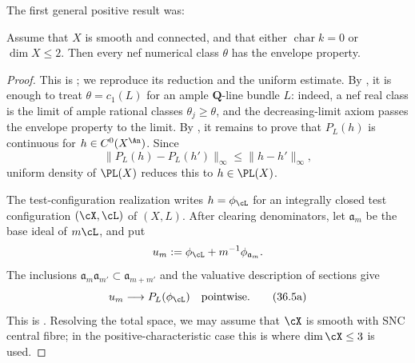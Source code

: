 The first general positive result was:

\begin{theorem}\label{thm:bj22-nef-envelope}
Assume that $X$ is smooth and connected, and that either
$\operatorname{char}k=0$ or $\dim X\leq2$.  Then every nef numerical
class $\theta$ has the envelope property.
\end{theorem}

\begin{proof}
This is \cite[Theorem~5.20]{BJ22}; we reproduce its reduction and the
uniform estimate.  By \cite[Lemma~5.9]{BJ22}, it is enough to treat
$\theta=c_1(L)$ for an ample $\mathbf Q$-line bundle $L$: indeed, a
nef real class is the limit of ample rational classes $\theta_j\geq\theta$,
and the decreasing-limit axiom passes the envelope property to the limit.
By , it remains
to prove that $P_L(h)$ is continuous for $h\in C^0(X^{\An})$.  Since
\[
 \lVert P_L(h)-P_L(h')\rVert_\infty
       \leq \lVert h-h'\rVert_\infty,
\]
uniform density of $\PL(X)$ reduces this to $h\in\PL(X)$.

The test-configuration realization
\cite[Theorem~2.31]{BJ22} writes $h=\phi_{\cL}$ for an integrally closed
test configuration $(\cX,\cL)$ of $(X,L)$.  After clearing
denominators, let $\mathfrak a_m$ be the base ideal of $m\cL$, and put
\[
 u_m:=\phi_{\cL}+m^{-1}\phi_{\mathfrak a_m}.
\]
The inclusions
$\mathfrak a_m\mathfrak a_{m'}\subset\mathfrak a_{m+m'}$ and the
valuative description of sections give
\[
                 u_m\longrightarrow P_L(\phi_{\cL})
                 \quad\text{pointwise}.
\tag{36.5a}\label{eq:bj22-nef-base-ideal-limit}
\]
This is \cite[Lemma~5.22]{BJ22}.  Resolving the total space, we may assume
that $\cX$ is smooth with SNC central fibre; in the positive-characteristic
case this is where $\dim\cX\leq3$ is used.


\end{proof}
